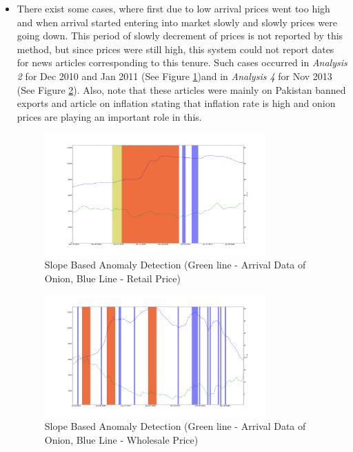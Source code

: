 \documentclass[a4paper,10pt]{report}
\begin{document}
\begin{itemize}
			
			
			\item There exist some cases, where first due to low arrival prices went too high and when arrival started entering into market slowly and slowly prices were going down. This period of slowly decrement of prices is not reported by this method, but since prices were still high, this system could not report dates for news articles corresponding to this tenure. Such cases occurred in \textit{Analysis 2} for Dec 2010 and Jan 2011 (See Figure \ref{fig:12124})and in \textit{Analysis 4} for Nov 2013 (See Figure \ref{fig:12144}). Also, note that these articles were mainly on Pakistan banned exports and article on inflation stating that inflation rate is high and onion prices are playing an important role in this.
			
			\begin{figure}[H]
		    	\centering
  		    	\includegraphics[width=0.8\textwidth]{graphs/12124.png}
		    	\caption{Slope Based Anomaly Detection (Green line - Arrival Data of Onion, Blue Line - Retail Price)}
		    	\label{fig:12124}
			\end{figure}
			
			\begin{figure}[H]
		    	\centering
  		    	\includegraphics[width=0.8\textwidth]{graphs/12144.png}
		    	\caption{Slope Based Anomaly Detection (Green line - Arrival Data of Onion, Blue Line - Wholesale Price)}
		    	\label{fig:12144}
			\end{figure}
			

\end{itemize}
\end{document}
